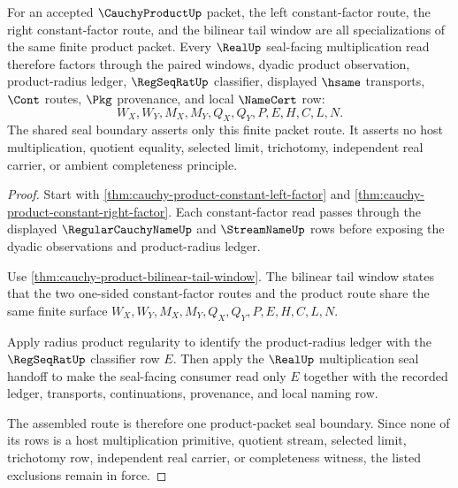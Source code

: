 \begin{theorem}
\label{thm:cauchy-product-constant-factor-bilinear-seal}
For an accepted $\CauchyProductUp$ packet, the left constant-factor route, the right constant-factor route, and the bilinear tail window are all specializations of the same finite product packet. Every $\RealUp$ seal-facing multiplication read therefore factors through the paired windows, dyadic product observation, product-radius ledger, $\RegSeqRatUp$ classifier, displayed $\hsame$ transports, $\Cont$ routes, $\Pkg$ provenance, and local $\NameCert$ row:
$$
W_X,W_Y,M_X,M_Y,Q_X,Q_Y,P,E,H,C,L,N.
$$
The shared seal boundary asserts only this finite packet route. It asserts no host multiplication, quotient equality, selected limit, trichotomy, independent real carrier, or ambient completeness principle.
\end{theorem}
\begin{proof}
Start with \autoref{thm:cauchy-product-constant-left-factor} and \autoref{thm:cauchy-product-constant-right-factor}. Each constant-factor read passes through the displayed $\RegularCauchyNameUp$ and $\StreamNameUp$ rows before exposing the dyadic observations and product-radius ledger.

Use \autoref{thm:cauchy-product-bilinear-tail-window}. The bilinear tail window states that the two one-sided constant-factor routes and the product route share the same finite surface $W_X,W_Y,M_X,M_Y,Q_X,Q_Y,P,E,H,C,L,N$.

Apply radius product regularity to identify the product-radius ledger with the $\RegSeqRatUp$ classifier row $E$. Then apply the $\RealUp$ multiplication seal handoff to make the seal-facing consumer read only $E$ together with the recorded ledger, transports, continuations, provenance, and local naming row.

The assembled route is therefore one product-packet seal boundary. Since none of its rows is a host multiplication primitive, quotient stream, selected limit, trichotomy row, independent real carrier, or completeness witness, the listed exclusions remain in force.
\end{proof}

